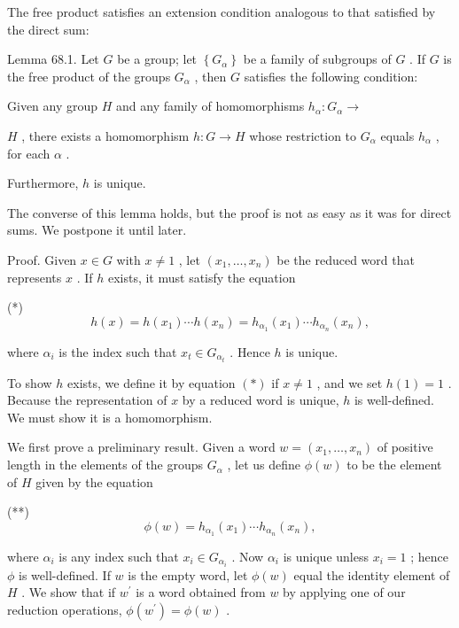 The free product satisfies an extension condition analogous to that satisfied by the direct sum:

Lemma 68.1. Let \(G\) be a group; let \(\left\{  {G}_{\alpha }\right\}\) be a family of subgroups of \(G\) . If \(G\) is the free product of the groups \({G}_{\alpha }\) , then \(G\) satisfies the following condition:

Given any group \(H\) and any family of homomorphisms \({h}_{\alpha } : {G}_{\alpha } \rightarrow\)

\(H\) , there exists a homomorphism \(h : G \rightarrow  H\) whose restriction to \({G}_{\alpha }\) equals \({h}_{\alpha }\) , for each \(\alpha\) .

Furthermore, \(h\) is unique.

The converse of this lemma holds, but the proof is not as easy as it was for direct sums. We postpone it until later.

Proof. Given \(x \in  G\) with \(x \neq  1\) , let \(\left( {{x}_{1},\ldots ,{x}_{n}}\right)\) be the reduced word that represents \(x\) . If \(h\) exists, it must satisfy the equation

(*)
\[
h\left( x\right)  = h\left( {x}_{1}\right) \cdots h\left( {x}_{n}\right)  = {h}_{{\alpha }_{1}}\left( {x}_{1}\right) \cdots {h}_{{\alpha }_{n}}\left( {x}_{n}\right) ,
\]

where \({\alpha }_{i}\) is the index such that \({x}_{t} \in  {G}_{{\alpha }_{t}}\) . Hence \(h\) is unique.

To show \(h\) exists, we define it by equation \(\left( *\right)\) if \(x \neq  1\) , and we set \(h\left( 1\right)  = 1\) . Because the representation of \(x\) by a reduced word is unique, \(h\) is well-defined. We must show it is a homomorphism.

We first prove a preliminary result. Given a word \(w = \left( {{x}_{1},\ldots ,{x}_{n}}\right)\) of positive length in the elements of the groups \({G}_{\alpha }\) , let us define \(\phi \left( w\right)\) to be the element of \(H\) given by the equation

(**)
\[
\phi \left( w\right)  = {h}_{{\alpha }_{1}}\left( {x}_{1}\right) \cdots {h}_{{\alpha }_{n}}\left( {x}_{n}\right) ,
\]

where \({\alpha }_{i}\) is any index such that \({x}_{i} \in  {G}_{{\alpha }_{i}}\) . Now \({\alpha }_{i}\) is unique unless \({x}_{i} = 1\) ; hence \(\phi\) is well-defined. If \(w\) is the empty word, let \(\phi \left( w\right)\) equal the identity element of \(H\) . We show that if \({w}^{\prime }\) is a word obtained from \(w\) by applying one of our reduction operations, \(\phi \left( {w}^{\prime }\right)  = \phi \left( w\right)\) .

